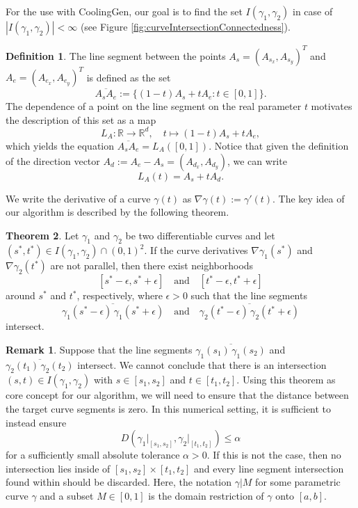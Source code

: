 \documentclass[a4paper, 11pt]{report}
\theoremstyle{definition}
\newtheorem{definition}{Definition}[section]
\newtheorem{theorem}[definition]{Theorem}
\newtheorem*{remark}{Remark}
\newcommand{\domrestr}{\big|}
\begin{document}
	For the use with CoolingGen, our goal is to find the set $I(\gamma_1, \gamma_2)$ in case of $|I(\gamma_1, \gamma_2)| < \infty$ (see Figure \ref{fig:curveIntersectionConnectedness}).

	\begin{definition}\label{def:linesegdef}
		The line segment between the points $A_s = (A_{s_x}, A_{s_y})^T$ and $A_e = (A_{e_x}, A_{e_y})^T$ is defined as the set
			$$ \overline{A_s A_e} := \{(1-t)A_s + tA_e : t \in [0,1]\}. $$
		The dependence of a point on the line segment on the real parameter $t$ motivates the description of this set as a map
			$$ L_A : \mathbb{R} \rightarrow \mathbb{R}^d, \quad t \mapsto (1-t)A_s + tA_e,$$
		which yields the equation $\overline{A_s A_e} = L_A([0,1])$. Notice that given the definition of the direction vector $A_d := A_e - A_s = (A_{d_x}, A_{d_y})$, we can write
			$$ L_A(t) = A_s + tA_d.$$
	\end{definition}
	
	We write the derivative of a curve $\gamma(t)$ as $\nabla \gamma(t) := \gamma'(t)$. The key idea of our algorithm is described by the following theorem.

	\begin{theorem}\label{thm:parallelintersection}
		Let $\gamma_1$ and $\gamma_2$ be two differentiable curves and let $(s^*, t^*) \in I(\gamma_1, \gamma_2) \cap (0,1)^2$. If the curve derivatives $\nabla\gamma_1(s^*)$ and $\nabla\gamma_2(t^*)$ are not parallel, then there exist neighborhoods 
			$$[s^*-\epsilon, s^*+\epsilon] \quad\text{and}\quad [t^*-\epsilon, t^*+\epsilon]$$
		around $s^*$ and $t^*$, respectively, where $\epsilon > 0$ such that the line segments
			$$\overline{\gamma_1(s^*-\epsilon) \, \gamma_1(s^*+\epsilon)} \quad\text{and}\quad \overline{\gamma_2(t^*-\epsilon) \, \gamma_2(t^*+\epsilon)}$$
		intersect. 
	\end{theorem}
	\begin{remark}
 		Suppose that the line segments $\overline{\gamma_1(s_1) \, \gamma_1(s_2)}$ and $\overline{\gamma_2(t_1) \, \gamma_2(t_2)}$ intersect. We cannot conclude that there is an intersection $(s,t) \in I(\gamma_1, \gamma_2)$ with $s \in [s_1, s_2]$ and $t \in [t_1, t_2]$. Using this theorem as core concept for our algorithm, we will need to ensure that the distance between the target curve segments is zero. In this numerical setting, it is sufficient to instead ensure
 			$$ D(\gamma_1 \domrestr_{[s_1, s_2]}, \gamma_2 \domrestr_{[t_1, t_2]}) \leq \alpha$$
 		for a sufficiently small absolute tolerance $\alpha > 0$. If this is not the case, then no intersection lies inside of $[s_1, s_2] \times [t_1, t_2]$ and every line segment intersection found within should be discarded. Here, the notation $\gamma \domrestr{M}$ for some parametric curve $\gamma$ and a subset $M \in [0,1]$ is the domain restriction of $\gamma$ onto $[a,b]$.
	\end{remark}
	
\end{document}
